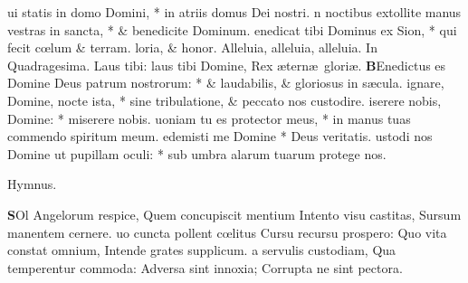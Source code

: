 \documentclass[letter,11pt]{book}
\begin{document}
\begin{multicols*}{2}
ui statis in domo Domini, * in atriis domus Dei nostri.
n noctibus extollite manus vestras in sancta,
* \& benedicite Dominum.
enedicat tibi Dominus ex Sion, * qui fecit c\oe lum \& terram.
loria, \& honor. Alleluia, alleluia, alleluia.
\newline \color{Red} In Quadragesima. \color{black} Laus tibi: laus tibi Domine, Rex \ae tern\ae \ glori\ae .
\lettrine[lines=2]{\bfseries \color{Red} B}{}Enedictus es Domine Deus patrum nostrorum: * \& laudabilis, \& gloriosus in s\ae cula.
ignare, Domine, nocte ista, * sine tribulatione, \& peccato nos custodire.
iserere nobis, Domine: * miserere nobis.
uoniam tu es protector meus, * in manus tuas commendo spiritum meum.
edemisti me Domine * Deus veritatis.
ustodi nos Domine ut pupillam oculi: * sub umbra alarum tuarum protege nos.
\vspace{-.5em} \begin{center} \color{Red} Hymnus. \end{center} \vspace{-.5em}
\lettrine[lines=2]{\bfseries \color{Red} S}{}Ol Angelorum respice,
\newline Quem concupiscit mentium
\newline \indent Intento visu castitas,
\newline \indent Sursum manentem cernere.
uo cuncta pollent c\oe litus
\newline \indent Cursu recursu prospero:
\newline \indent Quo vita constat omnium,
\newline \indent Intende grates supplicum.
a servulis custodiam,
\newline \indent Qua temperentur commoda:
\newline \indent Adversa sint innoxia;
\newline \indent Corrupta ne sint pectora.

\end{multicols*}
\end{document}
